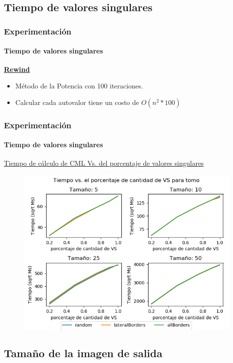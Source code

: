 \documentclass{beamer}
\begin{document}
\subsection{Tiempo de valores singulares}

\begin{frame}
  \frametitle{Experimentación}
  \framesubtitle{Tiempo de valores singulares}
  \textbf{\underline{Rewind}}
  \begin{itemize}
    \item<1-> Método de la Potencia con 100 iteraciones.
    \item<2-> Calcular cada autovalor tiene un costo de $O(n^2 * 100)$
  \end{itemize}
\end{frame}


\begin{frame}
  \frametitle{Experimentación}
  \framesubtitle{Tiempo de valores singulares}
  \underline{Tiempo de cálculo de CML Vs. del porcentaje de valores singulares}
  \begin{figure}[H]
    \centering
    \includegraphics[height=0.75\textheight]{../graficos/eigens-time/tomo/noise_graph.png}
  \end{figure}
\end{frame}

\subsection{Tamaño de la imagen de salida}
\end{document}
